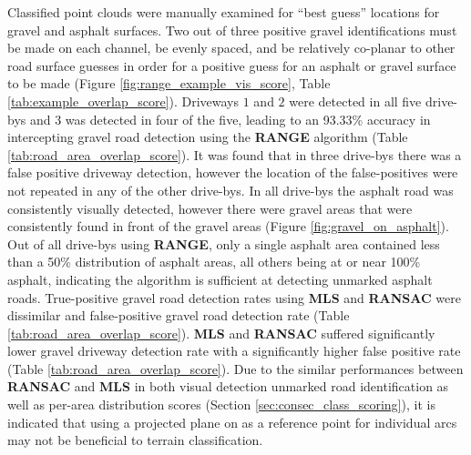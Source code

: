 \documentclass[numbered,pdftex]{ohio-etd}
\begin{document}
{{		{Classified point clouds were manually examined for ``best guess'' locations for gravel and asphalt surfaces. Two out of three positive gravel identifications must be made on each channel, be evenly spaced, and be relatively co-planar to other road surface guesses in order for a positive guess for an asphalt or gravel surface to be made (Figure \ref{fig:range_example_vis_score}, Table \ref{tab:example_overlap_score}). Driveways $1$ and $2$ were detected in all five drive-bys and $3$ was detected in four of the five, leading to an 93.33\% accuracy in intercepting gravel road detection using the \textbf{RANGE} algorithm (Table \ref{tab:road_area_overlap_score}). It was found that in three drive-bys there was a false positive driveway detection, however the location of the false-positives were not repeated in any of the other drive-bys. In all drive-bys the asphalt road was consistently visually detected, however there were gravel areas that were consistently found in front of the gravel areas (Figure \ref{fig:gravel_on_asphalt}). Out of all drive-bys using \textbf{RANGE}, only a single asphalt area contained less than a 50\% distribution of asphalt areas, all others being at or near 100\% asphalt, indicating the algorithm is sufficient at detecting unmarked asphalt roads. True-positive gravel road detection rates using \textbf{MLS} and \textbf{RANSAC} were dissimilar and false-positive gravel road detection rate (Table \ref{tab:road_area_overlap_score}). \textbf{MLS} and \textbf{RANSAC} suffered significantly lower gravel driveway detection rate with a significantly higher false positive rate (Table \ref{tab:road_area_overlap_score}). Due to the similar performances between \textbf{RANSAC} and \textbf{MLS} in both visual detection unmarked road identification as well as per-area distribution scores (Section \ref{sec:consec_class_scoring}), it is indicated that using a projected plane on as a reference point for individual arcs may not be beneficial to terrain classification.}
		
		
}}
\end{document}
